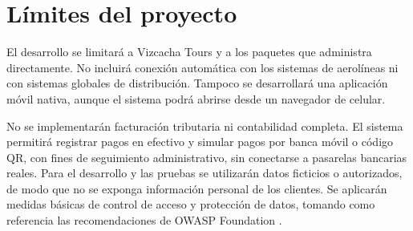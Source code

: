 \chapter{Límites del proyecto}
\label{cap:limites}

El desarrollo se limitará a Vizcacha Tours y a los paquetes que administra
directamente. No incluirá conexión automática con los sistemas de aerolíneas
ni con sistemas globales de distribución. Tampoco se desarrollará una
aplicación móvil nativa, aunque el sistema podrá abrirse desde un navegador de
celular.

No se implementarán facturación tributaria ni contabilidad completa. El
sistema permitirá registrar pagos en efectivo y simular pagos por banca móvil
o código QR, con fines de seguimiento administrativo, sin conectarse a
pasarelas bancarias reales. Para el desarrollo y las pruebas se utilizarán
datos ficticios o autorizados, de modo que no se exponga información personal
de los clientes. Se aplicarán medidas básicas de control de acceso y
protección de datos, tomando como referencia las recomendaciones de OWASP
Foundation \parencite{owasp2025}.
